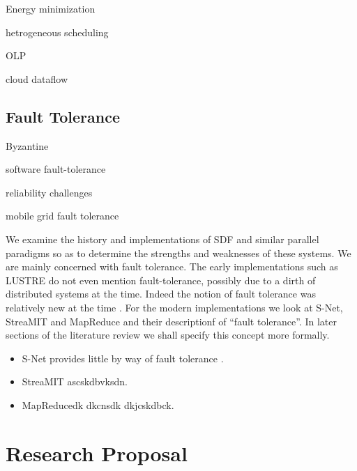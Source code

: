 Energy minimization \cite{boy01}

hetrogeneous scheduling \cite{len87}

OLP \cite{hen99}

cloud dataflow \cite{tsa09}

\subsection*{Fault Tolerance}

Byzantine \cite{lam86}

software fault-tolerance \cite{ran75}

reliability challenges \cite{ree06}

mobile grid fault tolerance\cite{lit07}



We examine the history and implementations of SDF and similar parallel paradigms so as to determine the strengths and weaknesses of these systems.
We are mainly concerned with fault tolerance.
The early implementations such as LUSTRE \cite{cas87} do not even mention fault-tolerance, possibly due to a dirth of distributed systems at the time.
Indeed the notion of fault tolerance was relatively new at the time \cite{ran75}.
For the modern implementations we look at S-Net, StreaMIT and MapReduce and their descriptionf of ``fault tolerance''.
In later sections of the literature review we shall specify this concept more formally.
\begin{itemize}
	\item S-Net provides little by way of fault tolerance \cite{pen09}.  
	\item{StreaMIT} ascskdbvksdn.
	\item{MapReduce}dk dkcnsdk dkjcskdbck.
\end{itemize}

\section*{Research Proposal}






